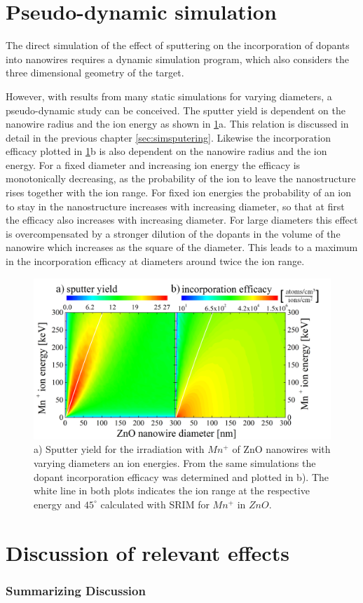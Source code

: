 \section{Pseudo-dynamic simulation}

The direct simulation of the effect of sputtering on the incorporation of dopants into nanowires requires a dynamic simulation program, which also considers the three dimensional geometry of the target.

However, with results from many static simulations for varying diameters, a pseudo-dynamic study can be conceived. The sputter yield is dependent on the nanowire radius and the ion energy as shown in \ref{sputterincorporate}a. This relation is discussed in detail in the previous chapter \ref{sec:simsputering}. Likewise the incorporation efficacy plotted in \ref{sputterincorporate}b is also dependent on the nanowire radius and the ion energy. For a fixed diameter and increasing ion energy the efficacy is monotonically decreasing, as the probability of the ion to leave the nanostructure rises together with the ion range. For fixed ion energies the probability of an ion to stay in the nanostructure increases with increasing diameter, so that at first the efficacy also increases with increasing diameter. For large diameters this effect is overcompensated by a stronger dilution of the dopants in the volume of the nanowire which increases as the square of the diameter. This leads to a maximum in the incorporation efficacy at diameters around twice the ion range. 

\begin{figure}
	\centering
		\includegraphics[width=.85\textwidth]{images/sputterincorporate.png}
	\caption{a) Sputter yield for the irradiation with $Mn^+$ of ZnO nanowires with varying diameters an ion energies. From the same simulations the dopant incorporation efficacy was determined and plotted in b). The white line in both plots indicates the ion range at the respective energy and $45^\circ$ calculated with SRIM for $Mn^+$ in $ZnO$.}
	\label{sputterincorporate}
\end{figure} 




\section{Discussion of relevant effects}

\subsubsection{Summarizing Discussion}
